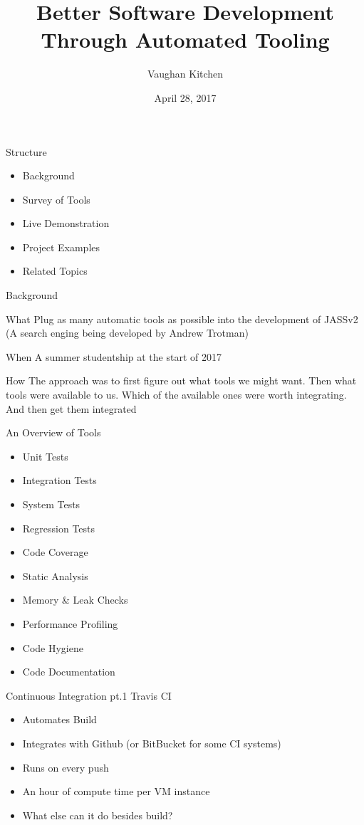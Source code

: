 \documentclass{beamer}
\title{Better Software Development Through Automated Tooling}
\author{Vaughan Kitchen}
\date{April 28, 2017}
\begin{document}
\begin{frame}
\titlepage
\end{frame}

\begin{frame}{Structure}
\begin{itemize}
	\item Background
	\item Survey of Tools
	\item Live Demonstration
	\item Project Examples
	\item Related Topics
\end{itemize}
\end{frame}

\begin{frame}{Background}
	\begin{block}{What}
		Plug as many automatic tools as possible into the development of JASSv2
		(A search enging being developed by Andrew Trotman)
	\end{block}
	\begin{block}{When}
		A summer studentship at the start of 2017
	\end{block}
	\begin{block}{How}
		The approach was to first figure out what tools we might want. Then what
		tools were available to us. Which of the available ones were worth
		integrating. And then get them integrated
	\end{block}
\end{frame}

\begin{frame}{An Overview of Tools}
	\begin{itemize}
		\item Unit Tests
		\item Integration Tests
		\item System Tests
		\item Regression Tests
		\item Code Coverage
		\item Static Analysis
		\item Memory \& Leak Checks
		\item Performance Profiling
		\item Code Hygiene
		\item Code Documentation
	\end{itemize}
\end{frame}

\begin{frame}{Continuous Integration pt.1}
	Travis CI
	\begin{itemize}
		\item Automates Build
		\item Integrates with Github (or BitBucket for some CI systems)
		\item Runs on every push
		\item An hour of compute time per VM instance
		\item What else can it do besides build?
	\end{itemize}
\end{frame}
\end{document}
